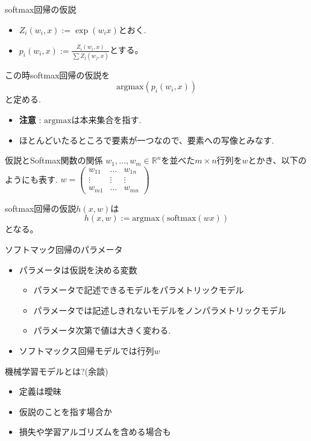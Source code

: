 \begin{frame}{softmax回帰の仮説}

\begin{itemize}
\item $Z_i(w_i, x) := \exp(w_i x)$とおく.
\item $p_i(w_i, x) := \frac{Z_i(w_i, x)}{\sum Z_j(w_j, x)}$とする。
\end{itemize}
この時softmax回帰の仮説を
$$
 \mathrm{argmax} (p_i(w_i, x))
$$
と定める.

\begin{itemize}
\item \textbf{注意} : $\mathrm{argmax}$は本来集合を指す.
\item ほとんどいたるところで要素が一つなので、要素への写像とみなす.
\end{itemize}
\end{frame}

\begin{frame}{仮説とSoftmax関数の関係}
$w_1, \ldots, w_m \in \mathbb{R}^n$を並べた$m \times n$行列を$w$とかき、以下のようにも表す.
$
w = \left(
\begin{array}{lll}
w_{11} & \ldots & w_{1n} \\
\vdots & \vdots & \vdots \\
w_{m1} & \ldots & w_{mn}
\end{array}
\right)
$

softmax回帰の仮説$h(x, w)$は
\begin{equation*}
  h(x, w) := \mathrm{argmax} \left(\mathrm{softmax}(wx)\right)
\end{equation*}
となる。
\end{frame}

\begin{frame}{ソフトマック回帰のパラメータ}
\begin{itemize}
\item パラメータは仮説を決める変数
  \begin{itemize}
  \item パラメータで記述できるモデルをパラメトリックモデル
  \item パラメータでは記述しきれないモデルをノンパラメトリックモデル
  \item パラメータ次第で値は大きく変わる.
  \end{itemize}
\item ソフトマックス回帰モデルでは行列$w$
\end{itemize}
\end{frame}

\begin{frame}{機械学習モデルとは?(余談)}
\begin{itemize}
\item 定義は曖昧
\item 仮説のことを指す場合か
\item 損失や学習アルゴリズムを含める場合も
\end{itemize}
\end{frame}

